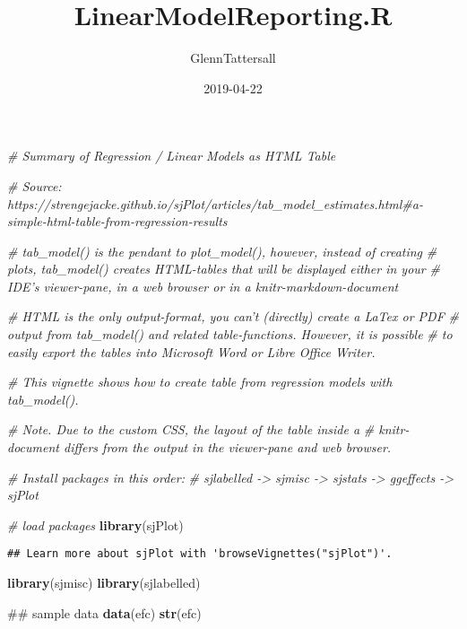 \documentclass[]{article}
\title{LinearModelReporting.R}
\author{GlennTattersall}
\date{2019-04-22}
\newenvironment{Shaded}{\begin{snugshade}}{\end{snugshade}}
\newcommand{\KeywordTok}[1]{\textcolor[rgb]{0.13,0.29,0.53}{\textbf{#1}}}
\newcommand{\CommentTok}[1]{\textcolor[rgb]{0.56,0.35,0.01}{\textit{#1}}}
\newcommand{\NormalTok}[1]{#1}
\begin{document}
\maketitle

\begin{Shaded}
\begin{Highlighting}[]
\CommentTok{# Summary of Regression / Linear Models as HTML Table}

\CommentTok{# Source: https://strengejacke.github.io/sjPlot/articles/tab_model_estimates.html#a-simple-html-table-from-regression-results}

\CommentTok{# tab_model() is the pendant to plot_model(), however, instead of creating }
\CommentTok{# plots, tab_model() creates HTML-tables that will be displayed either in your }
\CommentTok{# IDE's viewer-pane, in a web browser or in a knitr-markdown-document }

\CommentTok{# HTML is the only output-format, you can't (directly) create a LaTex or PDF }
\CommentTok{# output from tab_model() and related table-functions. However, it is possible}
\CommentTok{# to easily export the tables into Microsoft Word or Libre Office Writer.}

\CommentTok{# This vignette shows how to create table from regression models with tab_model(). }

\CommentTok{# Note. Due to the custom CSS, the layout of the table inside a}
\CommentTok{# knitr-document differs from the output in the viewer-pane and web browser.}

\CommentTok{# Install packages in this order:}
\CommentTok{# sjlabelled -> sjmisc -> sjstats -> ggeffects -> sjPlot}

\CommentTok{# load packages}
\KeywordTok{library}\NormalTok{(sjPlot)}
\end{Highlighting}
\end{Shaded}

\begin{verbatim}
## Learn more about sjPlot with 'browseVignettes("sjPlot")'.
\end{verbatim}

\begin{Shaded}
\begin{Highlighting}[]
\KeywordTok{library}\NormalTok{(sjmisc)}
\KeywordTok{library}\NormalTok{(sjlabelled)}

\NormalTok{## sample data}
\KeywordTok{data}\NormalTok{(efc)}
\KeywordTok{str}\NormalTok{(efc)}
\end{Highlighting}
\end{Shaded}
\end{document}
